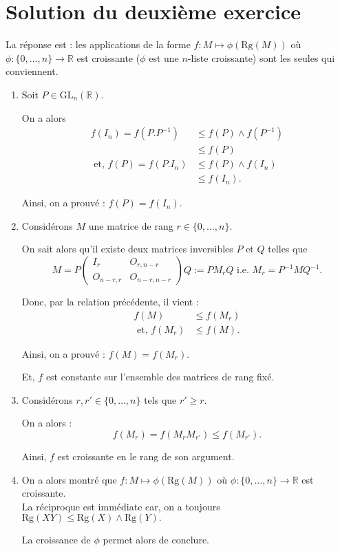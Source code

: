   
 
  

 
 
 

\section{Solution du deuxième exercice}
 
La réponse est : les applications de la forme $f: \displaystyle M\mapsto \phi(\mbox{Rg}(M))$ où $\displaystyle \phi : \{0,\ldots,n\}\rightarrow \mathbb{R}$ est croissante ($\phi$ est une $n$-liste croissante) sont les seules qui conviennent.

\begin{enumerate}
\item Soit $P\in \mbox{GL}_{n}(\mathbb{R}).$

On a  alors 
\begin{align*}
f(I_{n})=f(P.P^{-1}) & \leq f(P)\wedge f(P^{-1})\\
& \leq f(P)\\
\mbox{ et, } f(P)=f(P.I_{n})& \leq f(P)\wedge f(I_{n})\\
& \leq f(I_{n}).
\end{align*}

Ainsi, on a prouvé : $\displaystyle f(P)=f(I_{n}).$

\item Considérons $M$ une matrice de rang $r\in \{0,\ldots,n\}.$

On sait alors qu'il existe deux matrices inversibles $P$ et $Q$ telles que  $$M=P\left( \begin{array}{ll}
I_{r} & O_{r,n-r}\\
O_{n-r,r} & O_{n-r,n-r}
\end{array}
\right) Q:=PM_{r}Q \mbox{ i.e. } M_{r}=P^{-1}MQ^{-1}.$$

Donc, par la relation précédente, il vient : 
\begin{align*}
f(M) & \leq f(M_{r})\\
\mbox{ et, } f(M_{r}) & \leq f(M).
\end{align*}

Ainsi, on a prouvé : $\displaystyle f(M)=f(M_{r}).$

Et, $f$ est constante sur l'ensemble des matrices de rang fixé.

\item Considérons $r,r'\in \{0,\ldots,n\}$ tels que $r'\geq r.$

On a alors : $$f(M_{r})=f(M_{r}M_{r'})\leq f(M_{r'}).$$

Ainsi, $f$ est croissante en le rang de son argument.
\item On a alors montré que $f: \displaystyle M\mapsto \phi(\mbox{Rg}(M))$ où $\displaystyle \phi : \{0,\ldots,n\}\rightarrow \mathbb{R}$ est croissante.\\ 

La réciproque est immédiate car, on a toujours $\displaystyle \mbox{Rg}(XY)\leq \mbox{Rg}(X)\wedge\mbox{Rg}(Y).$ 

La croissance de $\phi$ permet alors de conclure.
\end{enumerate}


